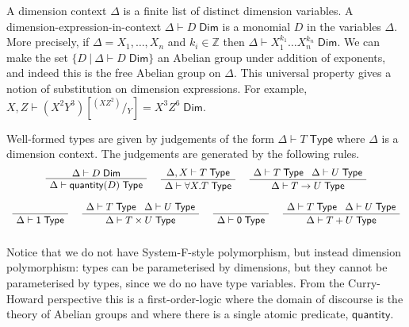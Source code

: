 \documentclass[a4paper,UKenglish]{lipics}
\newcommand{\msf}[1]{\mathsf{#1}} %
\newcommand{\Ab}{\msf{Ab}}
\newcommand{\LAb}{\msf{L}_{\msf{Ab}}}
\newcommand{\C}{\mathcal{C}}
\newcommand{\unitTy}{\msf{1}}
\newcommand{\emptyTy}{\msf{0}}
\newcommand{\qnt}{\msf{quantity}}
\newcommand{\Tj}[2]{#1 \vdash #2 \; \msf{ Type}}
\newcommand{\Dj}[2]{#1 \vdash #2 \; \msf{ Dim}}
\newcommand{\Dim}{D}
\newcommand{\Dvar}{X}
\begin{document}
\vspace{3mm} 
A dimension context $\Delta$ is a finite list of distinct
dimension variables.
A dimension-expression-in-context $\Dj\Delta \Dim$ is a monomial
$\Dim$ in the variables $\Delta$.
More precisely,
if $\Delta=\Dvar_1,\ldots, \Dvar_n$ and $k_i\in\mathbb Z$
then $\Dj \Delta{\Dvar_1^{k_1}\dots \Dvar_n^{k_n}}$.
We can make the set $\{\Dim~|~\Dj \Delta \Dim\}$ an Abelian group under addition of
exponents, and indeed this is the free Abelian group on $\Delta$.
This universal property gives a notion of substitution on dimension expressions.
For example,
$\Dj{X,Z}{(X^2Y^3)[^{(XZ^2)}\!/\!_Y]=X^3Z^6}$.


\vspace{3mm}  Well-formed types are given by judgements of the form $\Tj\Delta  T$ where
$\Delta$ is a dimension context. The judgements are generated by the following rules.
\[\begin{array}{c}
\AxiomC{$\Dj\Delta \Dim$}
		\UnaryInfC{$\Tj\Delta {\qnt(\Dim)}$}
		\DisplayProof

\hspace{5mm}
\AxiomC{$\Tj {\Delta, \Dvar}  T$}
	\UnaryInfC{$\Tj \Delta{ \forall \Dvar.T} $}
	\DisplayProof
\hspace{5mm}
\AxiomC{$\Delta \vdash T \; \msf{ Type} \; \; \; \Delta \vdash U \; \msf{ Type}$}
	\UnaryInfC{$\Delta \vdash T \rightarrow U  \; \msf{ Type}$}
	\DisplayProof
\\ \\
\AxiomC{  $\phantom{\vdash T \; \msf{ Type}}$ }
		\UnaryInfC{$\Delta \vdash \unitTy \; \msf{ Type}$}
	\DisplayProof
\hspace{5mm}
\AxiomC{$\Delta \vdash T \; \msf{ Type} \; \; \; \Delta \vdash U \; \msf{ Type}$}
	\UnaryInfC{$\Delta \vdash T\times U \; \msf{ Type}$}
	\DisplayProof
\hspace{5mm}
\AxiomC{  $\phantom{ \vdash T \; \msf{ Type}}$ }
		\UnaryInfC{$\Delta \vdash \emptyTy \; \msf{ Type}$}
	\DisplayProof
\hspace{5mm}
\AxiomC{$\Delta \vdash T \; \msf{ Type} \; \; \; \Delta \vdash U \; \msf{ Type}$}
	\UnaryInfC{$\Delta \vdash T + U \; \msf{ Type}$}
	\DisplayProof
\\ \\
\end{array}\]
Notice that we do not have System-F-style polymorphism, but instead dimension polymorphism: types can be parameterised by dimensions, but they cannot be parameterised by types, since we do no have type variables. From the Curry-Howard perspective this is a first-order-logic where the domain of discourse is the theory of Abelian groups and where there is a single atomic predicate, $\qnt$.
\end{document}
